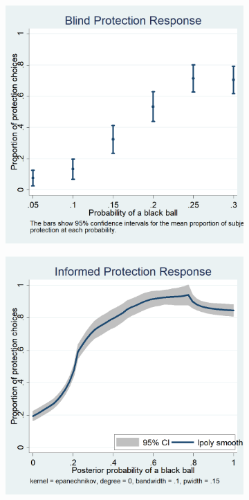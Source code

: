 \documentclass[12pt,a4paper]{article}
\begin{document}
\begin{figure}[H]
\centering
\caption{Average Protection Response} \label{fig:ProtResponse}
\begin{subfigure}[t]{.45\textwidth}
  \centering
\includegraphics[width=\textwidth]{Graphs/blind_prot_sta.png}
\end{subfigure}
\begin{subfigure}[t]{.45\textwidth}
  \includegraphics[width=\textwidth]{Graphs/ip_response_lpoly.png}
\end{subfigure}
%
\end{figure}
\end{document}
